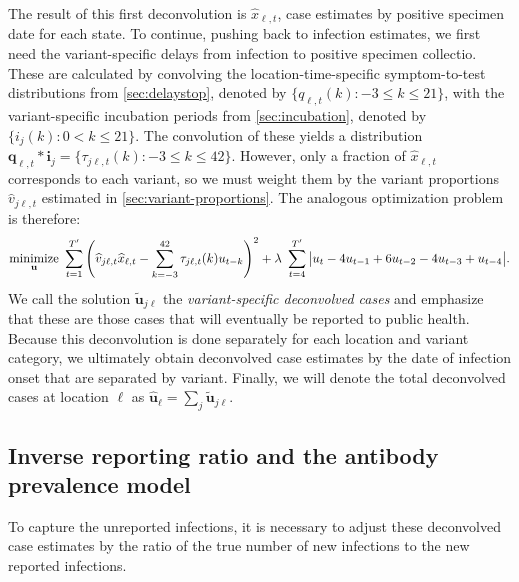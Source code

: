 The result of this first deconvolution is $\widehat{x}_{\ell,t}$, case estimates
by positive specimen date for each state. To continue, pushing back to infection
estimates, we first need the variant-specific delays from infection to positive
specimen collectio. These are calculated by convolving the
location-time-specific symptom-to-test distributions from
\autoref{sec:delaystop}, denoted by $\{q_{\ell,t}(k) : -3\leq k \leq 21\}$, with
the variant-specific incubation periods from \autoref{sec:incubation}, denoted
by $\{i_{j}(k) : 0 < k \leq 21\}$. The convolution of these yields a
distribution $\mathbf{q}_{\ell,t}*\mathbf{i}_j = \{\tau_{j\ell,t}(k): -3 \leq k
\leq 42\}$. However, only a fraction of $\widehat{x}_{\ell,t}$ corresponds to
each variant, so we must weight them by the variant proportions
$\widehat{v}_{j\ell,t}$ estimated in \autoref{sec:variant-proportions}. The
analogous optimization problem is therefore:
\begin{align}
\operatorname*{minimize}_{\mathbf{u}}\ \sum_{t=1}^{T'} 
\left( 
    \widehat{v}_{j\ell,t}\widehat{x}_{\ell,t} -  
    \sum_{k=-3}^{42} \tau_{j\ell,t}(k) u_{t-k} 
\right)^2 
+ \lambda\ \sum_{t=4}^{T'} \big|u_{t} - 4u_{t-1} + 6u_{t-2} -4u_{t-3}+ u_{t-4}\big|.
\end{align}
We call the solution $\widetilde{\mathbf{u}}_{j\ell}$ the \emph{variant-specific
deconvolved cases} and emphasize that these are those cases that will eventually
be reported to public health. Because this deconvolution is done separately for
each location and variant category, we ultimately obtain deconvolved case
estimates by the date of infection onset that are separated by variant. Finally,
we will denote the total deconvolved cases at location $\ell$ as
$\widehat{\mathbf{u}}_\ell = \sum_j \widetilde{\mathbf{u}}_{j\ell}$. 

\subsection{Inverse reporting ratio and the antibody prevalence model} 
\label{sec:report-ratio}

To capture the unreported infections, it is necessary to adjust these
deconvolved case estimates by the ratio of the true number of new infections to
the new reported infections. 

